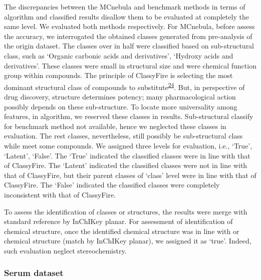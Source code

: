 \documentclass[
]{article}
\begin{document}
The discrepancies between the MCnebula and benchmark methods in terms of
algorithm and classified results disallow them to be evaluated at
completely the same level. We evaluated both methods respectively. For
MCnebula, before assess the accuracy, we interrogated the obtained
classes generated from pre-analysis of the origin dataset. The classes
over in half were classified based on sub-structural class, such as
`Organic carbonic acids and derivatives', `Hydroxy acids and
derivatives'. These classes were small in structural size and were
chemical function group within compounds. The principle of ClassyFire is
selecting the most dominant structural class of compounds to
substitute\textsuperscript{\protect\hyperlink{ref-2016}{24}}. But, in
perspective of drug discovery, structure determines potency; many
pharmacological action possibly depends on these sub-structure. To
locate more universality among features, in algorithm, we reserved these
classes in results. Sub-structural classify for benchmark method not
available, hence we neglected these classes in evaluation. The rest
classes, nevertheless, still possibly be sub-structural class while meet
some compounds. We assigned three levels for evaluation, i.e., `True',
`Latent', `False'. The `True' indicated the classified classes were in
line with that of ClassyFire. The `Latent' indicated the classified
classes were not in line with that of ClassyFire, but their parent
classes of `class' level were in line with that of ClassyFire. The
`False' indicated the classified classes were completely inconsistent
with that of ClassyFire.

To assess the identification of classes or structures, the results were
merge with standard reference by InChIKey planar. For assessment of
identification of chemical structure, once the identified chemical
structure was in line with or chemical structure (match by InChIKey
planar), we assigned it as `true'. Indeed, such evaluation neglect
stereochemistry.

\hypertarget{serum-dataset}{%
\subsubsection{Serum dataset}\label{serum-dataset}}
\end{document}
